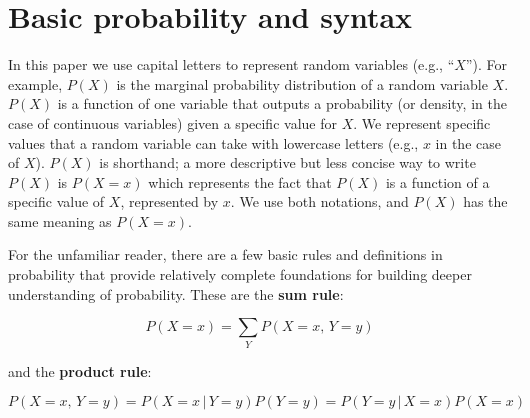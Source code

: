 \documentclass[12pt]{article}
\begin{document}
\appendix
\section{Basic probability and syntax}
\label{prob-theory}

In this paper we use capital letters to represent random variables
(e.g., ``$X$''). For example, $P(X)$ is the marginal probability distribution
of a random variable $X$. $P(X)$ is a function of one variable that
outputs a probability (or density, in the case of continuous
variables) given a specific value for $X$. We represent specific
values that a random variable can take with lowercase letters (e.g.,
$x$ in the case of $X$). $P(X)$ is shorthand; a more descriptive but
less concise way to write $P(X)$ is $P(X=x)$ which represents the fact
that $P(X)$ is a function of a specific value of $X$, represented by
$x$. We use both notations, and $P(X)$ has the same meaning as
$P(X=x)$.

For the unfamiliar reader, there are a few basic rules and definitions
in probability that provide relatively complete foundations for
building deeper understanding of probability. These are the
\textbf{sum rule}:

\begin{equation} P(X=x) = \sum_Y P(X=x,\, Y=y)
  \label{eq:sum}
\end{equation}

and the \textbf{product rule}:

\begin{equation} P(X=x, \, Y=y) = P(X = x \, | \, Y=y ) P(Y=y) = P(Y =
  y \, | \, X=x ) P(X=x)
  \label{eq:product}
\end{equation}
\end{document}
